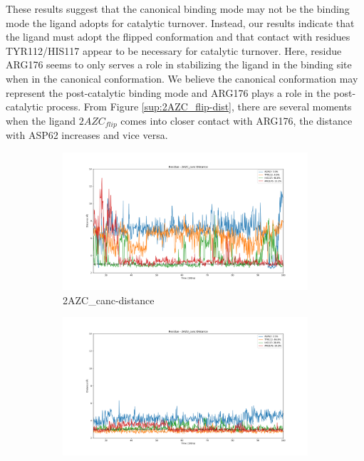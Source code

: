 \documentclass[fleqn,10pt]{wlscirep}
\begin{document}
These results suggest that the canonical binding mode may not be the binding mode the ligand adopts for catalytic turnover.
Instead, our results indicate that the ligand must adopt the flipped conformation and that contact with residues TYR112/HIS117 appear to be necessary for catalytic turnover.
Here, residue ARG176 seems to only serves a role in stabilizing the ligand in the binding site when in the canonical conformation.
We believe the canonical conformation may represent the post-catalytic binding mode and ARG176 plays a role in the post-catalytic process.
From Figure \ref{sup:2AZC_flip-dist}, there are several moments when the ligand $2AZC_{flip}$ comes into closer contact with ARG176, the distance with ASP62 increases and vice versa.

\begin{figure}[!ht]
\centering
   \begin{subfigure}{.45\textwidth}
     \centering
     \includegraphics[width=.95\linewidth]{2AZC_canc/2AZC_canc-dist_3.png}
     \caption{2AZC_{canc}-distance}
     \label{fig:2AZC_canc-dist}
   \end{subfigure}
   \begin{subfigure}{.45\textwidth}
     \centering
     \includegraphics[width=.95\linewidth]{2AZU_canc/2AZU_canc-dist_4.png}

\end{subfigure}
\end{figure}
\end{document}
